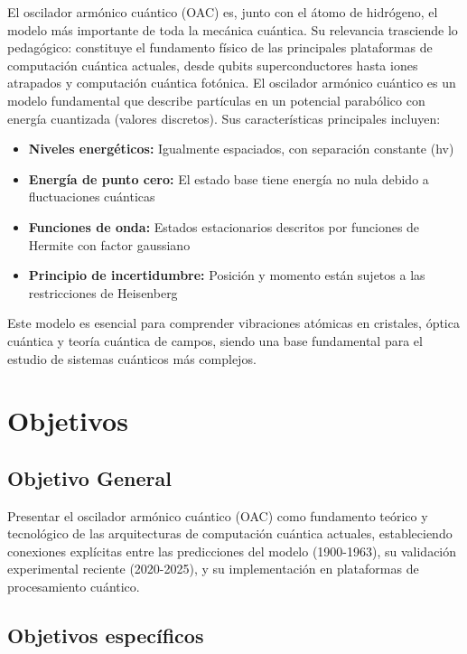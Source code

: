 \documentclass[11pt,a4paper,spanish]{book}
\begin{document}
El oscilador armónico cuántico (OAC) es, junto con el átomo de hidrógeno, el modelo más importante de toda la mecánica cuántica. Su relevancia trasciende lo pedagógico: constituye el fundamento físico de las principales plataformas de computación cuántica actuales, desde qubits superconductores hasta iones atrapados y computación cuántica fotónica.
El oscilador armónico cuántico es un modelo fundamental que describe partículas en un potencial parabólico con energía cuantizada (valores discretos). Sus características principales incluyen:
\begin{itemize}
	\item \textbf{Niveles energéticos:} Igualmente espaciados, con separación constante (hv)
	\item \textbf{Energía de punto cero:} El estado base tiene energía no nula debido a fluctuaciones cuánticas
	\item \textbf{Funciones de onda:} Estados estacionarios descritos por funciones de Hermite con factor gaussiano
	\item \textbf{Principio de incertidumbre:} Posición y momento están sujetos a las restricciones de Heisenberg
\end{itemize}

Este modelo es esencial para comprender vibraciones atómicas en cristales, óptica cuántica y teoría cuántica de campos, siendo una base fundamental para el estudio de sistemas cuánticos más complejos.


\chapter{Objetivos}

\section {Objetivo General}
Presentar el oscilador armónico cuántico (OAC) como fundamento teórico y tecnológico de las arquitecturas de computación cuántica actuales, estableciendo conexiones explícitas entre las predicciones del modelo (1900-1963), su validación experimental reciente (2020-2025), y su implementación en plataformas de procesamiento cuántico.

\section {Objetivos específicos}
\end{document}

